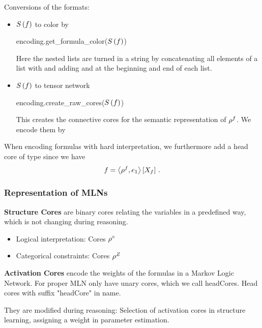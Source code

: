 Conversions of the formats:
\begin{itemize}
	\item $S\left(f\right)$ to color by
		\begin{centeredcode} 
			encoding.get\_formula\_color($S\left(f\right)$)
		\end{centeredcode}
		Here the nested lists are turned in a string by concatenating all elements of a list with \stringof{\_} and adding \stringof{[} and \stringof{]} at the beginning and end of each list.
	\item  $S\left(f\right)$ to tensor network 
		\begin{centeredcode}
			encoding.create\_raw\_cores($S\left(f\right)$)
		\end{centeredcode}
		This creates the connective cores for the semantic representation of $\rho^{f}$.
We encode them by
\end{itemize}

When encoding formulas with hard interpretation, we furthermore add a head core of type  since we have
 	\[ {f} = \left\langle \rho^{f},e_1\right\rangle \left[ X_{f} \right] \, . \]



\subsubsection{Representation of MLNs}

\textbf{Structure Cores} are binary cores relating the variables in a predefined way, which is not changing during reasoning.
\begin{itemize}
	\item Logical interpretation: Cores $\rho^{\circ}$ 
	\item Categorical constraints: Cores $\rho^{Z}$
\end{itemize}

\textbf{Activation Cores} encode the weights of the formulas in a Markov Logic Network.
For proper MLN only have unary cores, which we call headCores.
Head cores with suffix "headCore" in name.

They are modified during reasoning: Selection of activation cores in structure learning, assigning a weight in parameter estimation.



